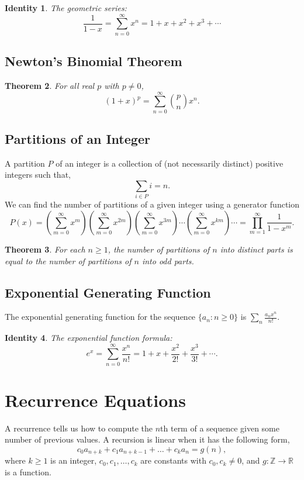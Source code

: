 \documentclass{article}
\newtheorem{theorem}{Theorem}[section]
\newtheorem{identity}[theorem]{Identity}
\begin{document}
\begin{identity} The geometric series:
\[
\frac {1}{1-x}=\sum _{n=0}^{\infty }x^{n}=1+x+x^{2}+x^{3}+\cdots
\]
\end{identity}

\subsection{Newton's Binomial Theorem}
\begin{theorem}
For all real $p$ with $p\neq 0$, 
\[
(1+x)^p=\sum_{n=0}^\infty\binom{p}{n}x^n.
\]
\end{theorem}

\subsection{Partitions of an Integer}
A partition $P$ of an integer is a collection of (not necessarily distinct) positive integers such that,
\[
\sum_{i\in P} i = n.
\]
We can find the number of partitions of a given integer using a generator function
\[
P(x) = \left(\sum_{m=0}^\infty x^{m}\right)\left(\sum_{m=0}^\infty x^{2m}\right)         \left(\sum_{m=0}^\infty x^{3m}\right)\cdots         \left(\sum_{m=0}^\infty x^{km}\right)\cdots = \prod_{m=1}^\infty\frac{1}{1-x^m}.
\]
\begin{theorem}
For each $n\geq 1$, the number of partitions of $n$ into distinct parts is equal to the number of partitions of $n$ into odd parts.
\end{theorem}

\subsection{Exponential Generating Function}
The exponential generating function for the sequence $\{a_n\colon n\geq 0\}$ is $\displaystyle \sum_n \frac{a_n x^n}{n!}$.

\begin{identity}The exponential function formula:
\[
e^{x} =\sum _{n=0}^{\infty }{\frac {x^{n}}{n!}}=1+x+{\frac {x^{2}}{2!}}+{\frac {x^{3}}{3!}}+\cdots.
\]
\end{identity}

\section{Recurrence Equations}
A recurrence tells us how to compute the $n$th term of a sequence given some number of previous values. A recursion is linear when it has the following form,
\[
c_0a_{n+k}+ c_1a_{n+k-1} + \dots+c_ka_{n} = g(n),
\]
where $k \geq 1$ is an integer, $c_0,c_1,\dots,c_k$ are constants with $c_0, c_k \neq 0$, and $g: \mathbb Z \rightarrow \mathbb R$ is a function.
\end{document}

